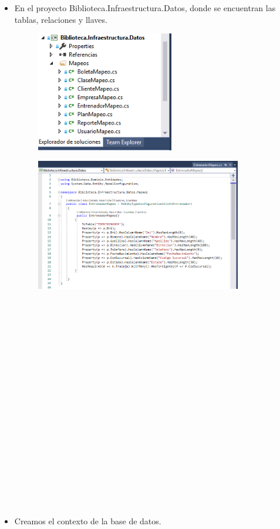 \documentclass[%
 reprint,
 amsmath,amssymb,
 aps,
]{revtex4-1}
\begin{document}
\begin{itemize}
	\item En el proyecto Biblioteca.Infraestructura.Datos, donde se encuentran las tablas, relaciones y llaves.
\begin{figure}[htb]
\begin{center}
\includegraphics[width=6cm]{./Imagenes/3}
\end{center}
\end{figure}
\begin{figure}[htb]
\begin{center}
\includegraphics[width=9cm]{./Imagenes/3-1}
\end{center}
\end{figure}
\\
\\
\\
\\
\\
\\
\\
\\
\\
\\
\\
\\
\\
\\
\\
\\
\\
\\
	\item Creamos el contexto de la base de datos.

\end{itemize}
\end{document}
